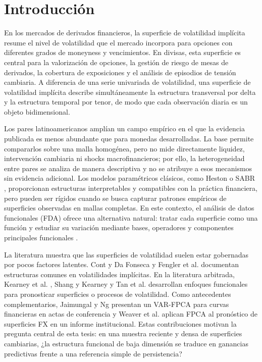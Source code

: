 \documentclass[a4paper,11pt]{article}
\newcommand{\SVI}{superficie de volatilidad implícita}
\begin{document}
\newpage
\tableofcontents
\newpage

\section{Introducción}

En los mercados de derivados financieros, la \SVI{} resume el nivel de volatilidad que el mercado incorpora para opciones con diferentes grados de moneyness y vencimientos. En divisas, esta superficie es central para la valorización de opciones, la gestión de riesgo de mesas de derivados, la cobertura de exposiciones y el análisis de episodios de tensión cambiaria. A diferencia de una serie univariada de volatilidad, una \SVI{} describe simultáneamente la estructura transversal por delta y la estructura temporal por tenor, de modo que cada observación diaria es un objeto bidimensional.

Los pares latinoamericanos amplían un campo empírico en el que la evidencia publicada es menos abundante que para monedas desarrolladas. La base permite compararlos sobre una malla homogénea, pero no mide directamente liquidez, intervención cambiaria ni shocks macrofinancieros; por ello, la heterogeneidad entre pares se analiza de manera descriptiva y no se atribuye a esos mecanismos sin evidencia adicional. Los modelos paramétricos clásicos, como Heston \cite{Heston1993} o SABR \cite{Hagan2002}, proporcionan estructuras interpretables y compatibles con la práctica financiera, pero pueden ser rígidos cuando se busca capturar patrones empíricos de superficies observadas en mallas completas. En este contexto, el análisis de datos funcionales (FDA) ofrece una alternativa natural: tratar cada superficie como una función y estudiar su variación mediante bases, operadores y componentes principales funcionales \cite{RamsaySilverman2005}.

La literatura muestra que las superficies de volatilidad suelen estar gobernadas por pocos factores latentes. Cont y Da Fonseca \cite{ContDaFonseca2002} y Fengler et al. \cite{Fengler2003} documentan estructuras comunes en volatilidades implícitas. En la literatura arbitrada, Kearney et al. \cite{Kearney2018}, Shang y Kearney \cite{ShangKearney2022} y Tan et al. \cite{Tan2024} desarrollan enfoques funcionales para pronosticar superficies o procesos de volatilidad. Como antecedentes complementarios, Jaimungal y Ng \cite{JaimungalNg2007} presentan un VAR-FPCA para curvas financieras en actas de conferencia y Weaver et al. \cite{Weaver2020} aplican FPCA al pronóstico de superficies FX en un informe institucional. Estas contribuciones motivan la pregunta central de esta tesis: en una muestra reciente y densa de superficies cambiarias, ¿la estructura funcional de baja dimensión se traduce en ganancias predictivas frente a una referencia simple de persistencia?
\end{document}
